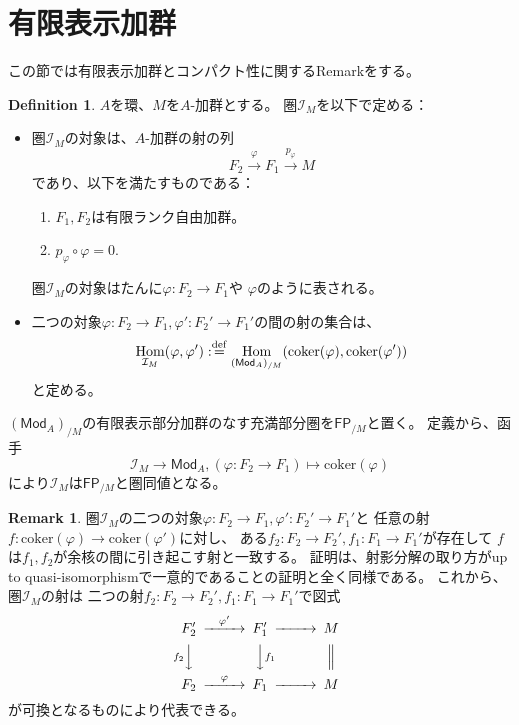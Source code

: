 \documentclass[uplatex]{jsarticle}
\theoremstyle{definition}
\newtheorem{defi}[defi]{Definition}
\newtheorem{rem}[rem]{Remark}
\DeclareMathOperator{\Hom}{Hom}
\newcommand{\coker}{\mathrm{coker}}
\newcommand{\FP}[1]{\mathsf{FP}_{/#1}}
\newcommand{\dfn}{:\overset{\mathrm{\scriptsize def}}{=}}
\newcommand{\Mod}{\mathsf{Mod}}
\newcommand{\mcI}{\mathcal{I}}
\begin{document}
\section{有限表示加群}

この節では有限表示加群とコンパクト性に関するRemarkをする。

\begin{defi}
  \(A\)を環、\(M\)を\(A\)-加群とする。
  圏\(\mcI_M\)を以下で定める：
  \begin{itemize}
    \item
    圏\(\mcI_M\)の対象は、\(A\)-加群の射の列
    \[
    F_2\xrightarrow{\varphi} F_1\xrightarrow{p_{\varphi}} M
    \]
    であり、以下を満たすものである：
    \begin{enumerate}
      \item
      \(F_1,F_2\)は有限ランク自由加群。
      \item
      \(p_{\varphi}\circ \varphi = 0\).
    \end{enumerate}
    圏\(\mathcal{I}_M\)の対象はたんに\(\varphi:F_2\to F_1\)や
    \(\varphi\)のように表される。
    \item
    二つの対象\(\varphi:F_2\to F_1, \varphi':F_2'\to F_1'\)の間の射の集合は、
    \[
    \Hom_{\mcI_M}(\varphi,\varphi') \dfn
    \Hom_{(\Mod_A)_{/M}}(\coker(\varphi),\coker(\varphi'))
    \]
    と定める。
  \end{itemize}
  \((\Mod_A)_{/M}\)の有限表示部分加群のなす充満部分圏を\(\FP{M}\)と置く。
  定義から、函手
  \[
  \mcI_M \to \Mod_A , (\varphi:F_2\to F_1) \mapsto \coker(\varphi)
  \]
  により\(\mcI_M\)は\(\FP{M}\)と圏同値となる。
\end{defi}




\begin{rem}\label{rem: I_M rem}
  圏\(\mcI_M\)の二つの対象\(\varphi:F_2\to F_1,\varphi':F_2'\to F_1'\)と
  任意の射\(f:\coker(\varphi)\to \coker(\varphi')\)に対し、
  ある\(f_2:F_2\to F_2', f_1:F_1\to F_1'\)が存在して
  \(f\)は\(f_1,f_2\)が余核の間に引き起こす射と一致する。
  証明は、射影分解の取り方がup to quasi-isomorphismで一意的であることの証明と全く同様である。
  これから、圏\(\mcI_M\)の射は
  二つの射\(f_2:F_2\to F_2', f_1:F_1\to F_1'\)で図式
  \[
  \begin{CD}
    F_2' @>\varphi'>> F_1' @>>> M \\
    @Vf_2VV @VVf_1V @| \\
    F_2 @>\varphi>> F_1 @>>> M
  \end{CD}
  \]
  が可換となるものにより代表できる。
\end{rem}
\end{document}
